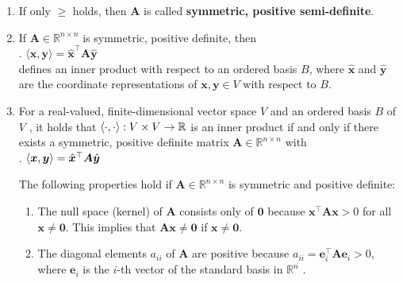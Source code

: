 \begin{enumerate}
    \item If only $\geq$ holds, then $\bm{A}$ is called \textbf{symmetric, positive semi-definite}.
    \hfill \cite{mfml/book/mml/Deisenroth-Faisal-Ong}

    \item If $\bm{A} \in \mathbb{R}^{n\times n}$ is symmetric, positive definite, then
    \hfill \cite{mfml/book/mml/Deisenroth-Faisal-Ong}
    \\
    .\hfill
    $⟨\bm{x}, \bm{y}⟩ = \hat{\bm{x}}^\top \bm{A} \hat{\bm{y}}$
    \hfill \cite{mfml/book/mml/Deisenroth-Faisal-Ong}
    \\
    defines an inner product with respect to an ordered basis $B$, where $\hat{\bm{x}}$ and $\hat{\bm{y}}$ are the coordinate representations of $\bm{x}, \bm{y} \in V$ with respect to $B$.
    \hfill \cite{mfml/book/mml/Deisenroth-Faisal-Ong}

    \item 
    \begin{theorem}
        For a real-valued, finite-dimensional vector space $V$ and an ordered basis $B$ of $V$ , it holds that $\langle\cdot, \cdot\rangle : V \times V \to \mathbb{R}$ is an inner product if and only if there exists a symmetric, positive definite matrix $\bm{A} \in \mathbb{R}^{n\times n}$ with
        \hfill \cite{mfml/book/mml/Deisenroth-Faisal-Ong}
        \\
        .\hfill
        $\langle\bm{x}, \bm{y}\rangle = \hat{\bm{x}} ^\top \bm{A} \hat{\bm{y}}$
        \hfill \cite{mfml/book/mml/Deisenroth-Faisal-Ong}
    \end{theorem}
    
    The following properties hold if $\bm{A} \in \mathbb{R}^{n\times n}$ is symmetric and positive definite:
    \hfill \cite{mfml/book/mml/Deisenroth-Faisal-Ong}
    \begin{enumerate}
        \item The null space (kernel) of $\bm{A}$ consists only of $\bm{0}$ because $\bm{x} ^\top \bm{Ax} > 0$ for all $\bm{x} \neq \bm{0}$. 
        This implies that $\bm{Ax} \neq \bm{0}$ if $\bm{x} \neq \bm{0}$.
        \hfill \cite{mfml/book/mml/Deisenroth-Faisal-Ong}

        \item The diagonal elements $a_{ii}$ of $\bm{A}$ are positive because $a_{ii} = \bm{e}^\top _i \bm{A} \bm{e}_i > 0$, where $\bm{e}_i$ is the $i$-th vector of the standard basis in $\mathbb{R}^n$ .
        \hfill \cite{mfml/book/mml/Deisenroth-Faisal-Ong}
    \end{enumerate}


\end{enumerate}
